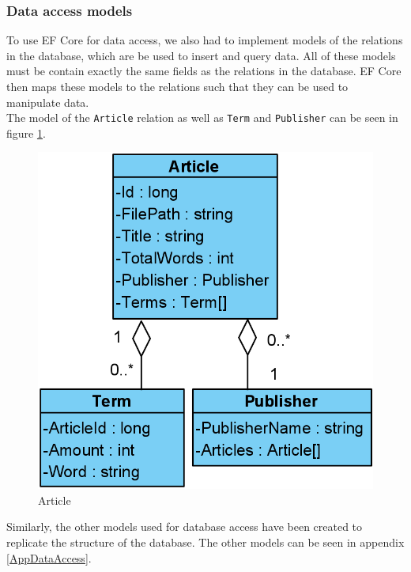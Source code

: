 \subsubsection*{Data access models}
To use EF Core for data access, we also had to implement models of the relations in the database, which are be used to insert and query data. 
All of these models must be contain exactly the same fields as the relations in the database.
EF Core then maps these models to the relations such that they can be used to manipulate data.
\\
The model of the \texttt{Article} relation as well as \texttt{Term} and \texttt{Publisher} can be seen in figure \ref*{Article}. 
\begin{figure}[H]
    \centering
    \includegraphics[scale=0.25]{Images/ArticleModel.PNG}
    \caption{Article}
    \label{Article}
\end{figure}
Similarly, the other models used for database access have been created to replicate the structure of the database. 
The other models can be seen in appendix \ref*{AppDataAccess}.